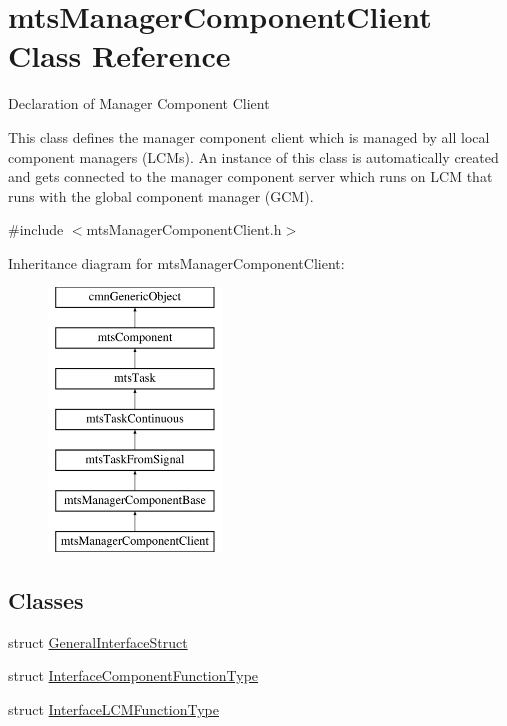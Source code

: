 \hypertarget{classmts_manager_component_client}{\section{mts\-Manager\-Component\-Client Class Reference}
\label{classmts_manager_component_client}
}


Declaration of Manager Component Client

This class defines the manager component client which is managed by all local component managers (L\-C\-Ms). An instance of this class is automatically created and gets connected to the manager component server which runs on L\-C\-M that runs with the global component manager (G\-C\-M).  




{\ttfamily \#include $<$mts\-Manager\-Component\-Client.\-h$>$}

Inheritance diagram for mts\-Manager\-Component\-Client\-:\begin{figure}[H]
\begin{center}
\leavevmode
\includegraphics[height=7.000000cm]{dd/d51/classmts_manager_component_client}
\end{center}
\end{figure}
\subsection*{Classes}
\begin{DoxyCompactItemize}
\item 
struct \hyperlink{structmts_manager_component_client_1_1_general_interface_struct}{General\-Interface\-Struct}
\item 
struct \hyperlink{structmts_manager_component_client_1_1_interface_component_function_type}{Interface\-Component\-Function\-Type}
\item 
struct \hyperlink{structmts_manager_component_client_1_1_interface_l_c_m_function_type}{Interface\-L\-C\-M\-Function\-Type}
\end{DoxyCompactItemize}
